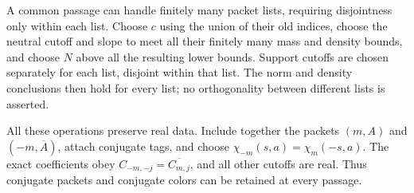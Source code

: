 \begin{remark}\label{rem:finite-family-passages}
A common passage can handle finitely many packet lists, requiring
disjointness only within each list. Choose $c$ using the union of
their old indices, choose the neutral cutoff and slope to meet all
their finitely many mass and density bounds, and choose $N$ above
all the resulting lower bounds. Support cutoffs are chosen
separately for each list, disjoint within that list. The norm and
density conclusions then hold for every list; no orthogonality
between different lists is asserted.
\end{remark}

All these operations preserve real data. Include together the
packets $(m,A)$ and $(-m,\overline A)$, attach conjugate tags, and
choose $\chi_{-m}(s,a)=\chi_m(-s,a)$. The exact coefficients obey
$C_{-m,-j}=\overline{C_{m,j}}$, and all other cutoffs are real.
Thus conjugate packets and conjugate colors can be retained at
every passage.
